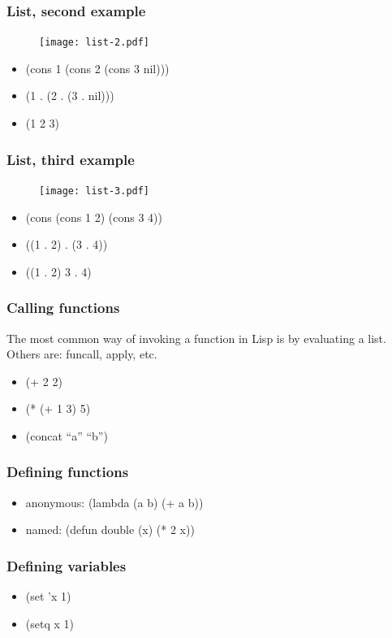 \documentclass[16pt]{beamer}
\begin{document}
\begin{frame}
  \frametitle{List, second example}
  \begin{figure}
    \texttt{[image: list-2.pdf]}
  \end{figure}
  \begin{itemize}
  \item (cons 1 (cons 2 (cons 3 nil)))
  \item (1 . (2 . (3 . nil)))
  \item (1 2 3)
  \end{itemize}
\end{frame}

\begin{frame}
  \frametitle{List, third example}
  \begin{figure}
    \texttt{[image: list-3.pdf]}
  \end{figure}
  \begin{itemize}
  \item (cons (cons 1 2) (cons 3 4))
  \item ((1 . 2) . (3 . 4))
  \item ((1 . 2) 3 . 4)
  \end{itemize}
\end{frame}

\begin{frame}
  \frametitle{Calling functions}
  \begin{block}{}
    The most common way of invoking a function in Lisp is by
    evaluating a list. Others are: funcall, apply, etc.
  \end{block}
  \begin{itemize}
  \item (+ 2 2)
  \item (* (+ 1 3) 5)
  \item (concat ``a'' ``b'')
  \end{itemize}
\end{frame}

\begin{frame}
  \frametitle{Defining functions}
  \begin{itemize}
  \item anonymous: (lambda (a b) (+ a b))
  \item named: (defun double (x) (* 2 x))
  \end{itemize}
\end{frame}

\begin{frame}
  \frametitle{Defining variables}
  \begin{itemize}
  \item (set 'x 1)
  \item (setq x 1)
  \end{itemize}
\end{frame}
\end{document}
